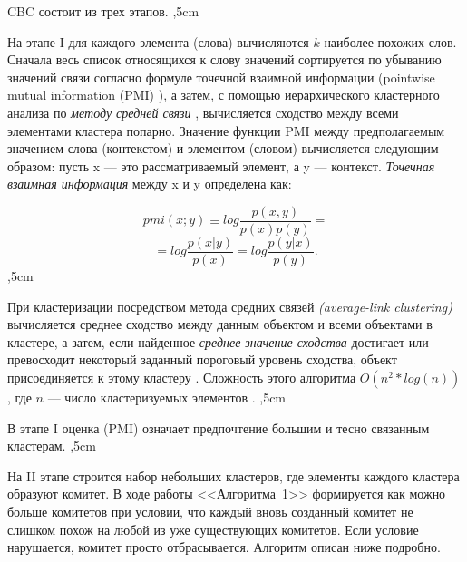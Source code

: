 \documentclass{article}
\begin{document}
\begin{articletext}
CBC состоит из трех этапов.
,5cm

На этапе I для каждого элемента (слова) вычисляются $k$ наиболее похожих слов. Сначала весь список относящихся к слову значений сортируется по убыванию значений связи согласно формуле точечной взаимной информации (pointwise mutual information (PMI) \cite{Manning 1999}), а затем, с помощью иерархического кластерного анализа по \textit{методу средней связи} \cite{Kim 1989}, вычисляется сходство между всеми элементами кластера попарно. Значение функции PMI \cite{Manning 1999} между предполагаемым значением слова (контекстом) и элементом (словом) вычисляется следующим образом: пусть x --- это рассматриваемый элемент, а y --- контекст. \textit{Точечная взаимная информация} между x и y определена как:

$$
pmi(x;y)\equiv log \frac{\displaystyle p(x,y)}{\displaystyle p(x)p(y)}=
$$
$$
=log\frac{\displaystyle p(x|y)}{\displaystyle p(x)}=log\frac{\displaystyle p(y|x)}{\displaystyle p(y)}.
$$
,5cm

При кластеризации посредством метода средних связей \textit{(average-link clustering)} вычисляется среднее сходство между данным объектом и всеми объектами в кластере, а затем, если найденное \textit{среднее значение сходства} достигает или превосходит некоторый заданный пороговый уровень сходства, объект присоединяется к этому кластеру \cite{Kim 1989}. Сложность этого алгоритма $O(n^2 * log (n))$, где $n$ --- число кластеризуемых элементов \cite{Jain 1999}.
,5cm

В этапе I оценка (PMI) означает предпочтение большим и тесно связанным кластерам.
,5cm

На II этапе строится набор небольших кластеров, где элементы каждого кластера образуют комитет. В ходе работы <<Алгоритма~1>> формируется как можно больше комитетов при условии, что каждый вновь созданный комитет не слишком похож на любой из уже существующих комитетов. Если условие нарушается, комитет просто отбрасывается. Алгоритм описан ниже подробно.


\end{articletext}
\end{document}
